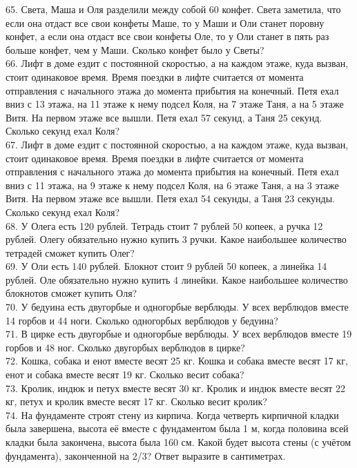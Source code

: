 65. Света, Маша и Оля разделили между собой 60 конфет. Света заметила, что если она отдаст все свои конфеты Маше, то у Маши и Оли станет поровну конфет, а если она отдаст все свои конфеты Оле, то у Оли станет в пять раз больше конфет, чем у Маши. Сколько конфет было у Светы?\\
66. Лифт в доме ездит с постоянной скоростью, а на каждом этаже, куда вызван, стоит одинаковое время. Время поездки в лифте считается от момента отправления с начального этажа до момента прибытия на конечный. Петя ехал вниз с 13 этажа, на 11 этаже к нему подсел Коля, на 7 этаже Таня, а на 5 этаже Витя. На первом этаже все вышли. Петя ехал 57 секунд, а Таня 25 секунд. Сколько секунд ехал Коля?\\
67. Лифт в доме ездит с постоянной скоростью, а на каждом этаже, куда вызван, стоит одинаковое время. Время поездки в лифте считается от момента отправления с начального этажа до момента прибытия на конечный. Петя ехал вниз с 11 этажа, на 9 этаже к нему подсел Коля, на 6 этаже Таня, а на 3 этаже Витя. На первом этаже все вышли. Петя ехал 54 секунды, а Таня 23 секунды. Сколько секунд ехал Коля?\\
68. У Олега есть 120 рублей. Тетрадь стоит 7 рублей 50 копеек, а ручка 12 рублей. Олегу обязательно нужно купить 3 ручки. Какое наибольшее количество тетрадей сможет купить Олег?\\
69. У Оли есть 140 рублей. Блокнот стоит 9 рублей 50 копеек, а линейка 14 рублей. Оле обязательно нужно купить 4 линейки. Какое наибольшее количество блокнотов сможет купить Оля?\\
70. У бедуина есть двугорбые и одногорбые верблюды. У всех верблюдов вместе 14 горбов и 44 ноги. Сколько одногорбых верблюдов у бедуина?\\
71. В цирке есть двугорбые и одногорбые верблюды. У всех верблюдов вместе 19 горбов и 48 ног. Сколько двугорбых верблюдов в цирке?\\
72. Кошка, собака и енот вместе весят 25 кг. Кошка и собака вместе весят 17 кг, енот и собака вместе весят 19 кг. Сколько весит собака?\\
73. Кролик, индюк и петух вместе весят 30 кг. Кролик и индюк вместе весят 22 кг, петух и кролик вместе весят 17 кг. Сколько весит кролик?\\
74. На фундаменте строят стену из кирпича. Когда четверть кирпичной кладки была завершена, высота её вместе с фундаментом была 1 м, когда половина всей кладки была закончена, высота была 160 см. Какой будет высота стены (с учётом фундамента), законченной на 2/3? Ответ выразите в сантиметрах.\\
